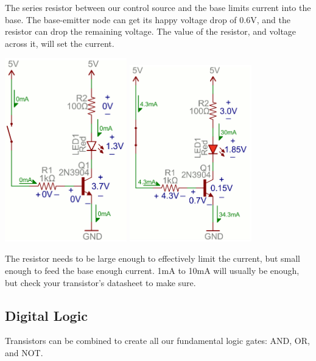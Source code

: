 \documentclass[a4paper, 11pt]{article} %
\begin{document}
The series resistor between our control source and the base limits current into the base. The base-emitter node can get its happy voltage drop of 0.6V, and the resistor can drop the remaining voltage. The value of the resistor, and voltage across it, will set the current.

\begin{center}
\includegraphics[width=150pt]{tran16}
\includegraphics[width=150pt]{tran16b}
\end{center}

The resistor needs to be large enough to effectively limit the current, but small enough to feed the base enough current. 1mA to 10mA will usually be enough, but check your transistor's datasheet to make sure.

\subsection*{Digital Logic}

Transistors can be combined to create all our fundamental logic gates: AND, OR, and NOT.\\
\end{document}
